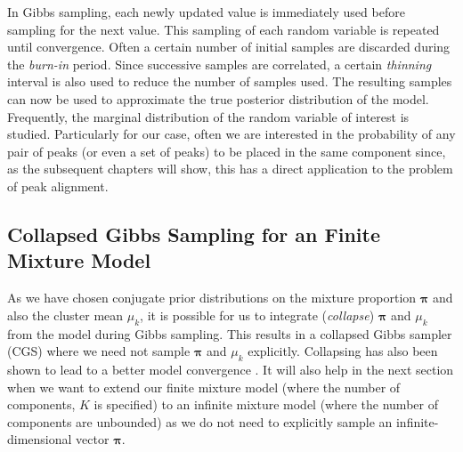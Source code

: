 In Gibbs sampling, each newly updated value is immediately used before sampling for the next value. This sampling of each random variable is repeated until convergence. Often a certain number of initial samples are discarded during the \emph{burn-in} period. Since successive samples are correlated, a certain \emph{thinning} interval is also used to reduce the number of samples used. The resulting samples can now be used to approximate the true posterior distribution of the model. Frequently, the marginal distribution of the random variable of interest is studied. Particularly for our case, often we are interested in the probability of any pair of peaks (or even a set of peaks) to be placed in the same component since, as the subsequent chapters will show, this has a direct application to the problem of peak alignment.

\subsection{Collapsed Gibbs Sampling for an Finite Mixture Model}

As we have chosen conjugate prior distributions on the mixture proportion $\boldsymbol{\pi}$ and also the cluster mean $\mu_k$, it is possible for us to integrate (\emph{collapse}) $\boldsymbol{\pi}$ and $\mu_k$ from the model during Gibbs sampling. This results in a collapsed Gibbs sampler (CGS) where we need not sample $\boldsymbol{\pi}$ and $\mu_k$ explicitly. Collapsing has also been shown to lead to a better model convergence \cite{gelman2014bayesian}. It will also help in the next section when we want to extend our finite mixture model (where the number of components, $K$ is specified) to an infinite mixture model (where the number of components are unbounded) as we do not need to explicitly sample an infinite-dimensional vector $\boldsymbol{\pi}$. 

